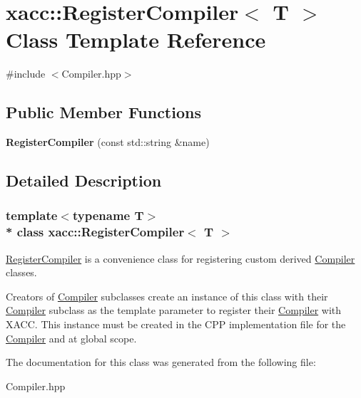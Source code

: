 \hypertarget{a00245}{}\section{xacc\+:\+:Register\+Compiler$<$ T $>$ Class Template Reference}
\label{a00245}


{\ttfamily \#include $<$Compiler.\+hpp$>$}

\subsection*{Public Member Functions}
\begin{DoxyCompactItemize}
\item 
{\bfseries Register\+Compiler} (const std\+::string \&name)\hypertarget{a00245_a41f5c1abd570b3867b9790cdc02f3355}{}\label{a00245_a41f5c1abd570b3867b9790cdc02f3355}

\end{DoxyCompactItemize}


\subsection{Detailed Description}
\subsubsection*{template$<$typename T$>$\\*
class xacc\+::\+Register\+Compiler$<$ T $>$}

\hyperlink{a00245}{Register\+Compiler} is a convenience class for registering custom derived \hyperlink{a00059}{Compiler} classes.

Creators of \hyperlink{a00059}{Compiler} subclasses create an instance of this class with their \hyperlink{a00059}{Compiler} subclass as the template parameter to register their \hyperlink{a00059}{Compiler} with X\+A\+CC. This instance must be created in the C\+PP implementation file for the \hyperlink{a00059}{Compiler} and at global scope. 

The documentation for this class was generated from the following file\+:\begin{DoxyCompactItemize}
\item 
Compiler.\+hpp\end{DoxyCompactItemize}
